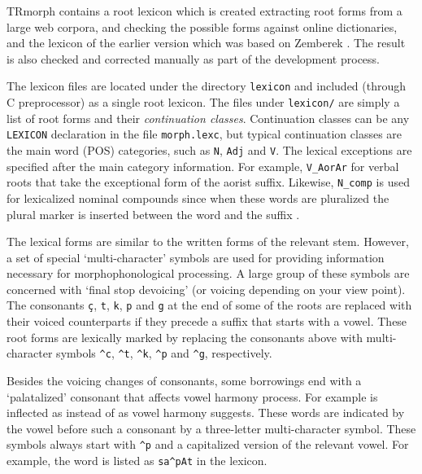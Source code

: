 \documentclass[twocolumn]{article}
\begin{document}
TRmorph contains a root lexicon which is created extracting root forms
from a large web corpora, and checking the possible forms against
online dictionaries, and the lexicon of the earlier version which was
based on Zemberek \parencite{akin2007}. The result is also checked and
corrected manually as part of the development process. 

The lexicon files are located under the directory \lstinline{lexicon}
and included (through C preprocessor) as a single root lexicon. The
files under \lstinline{lexicon/} are simply a list of root forms and
their \emph{continuation classes}. Continuation classes can be any
\lstinline{LEXICON} declaration in the file \lstinline{morph.lexc},
but typical continuation classes are the main word (POS) categories,
such as \texttt{N}, \texttt{Adj} and \texttt{V}. The lexical
exceptions are specified after the main category information. For
example, \texttt{V\_AorAr} for verbal roots that take the exceptional
 form of the aorist suffix. Likewise, \texttt{N\_comp} is
used for lexicalized nominal  compounds since when these
words are pluralized the plural marker is inserted between the word
and the suffix .

The lexical forms are similar to the written forms of the relevant
stem. However, a set of special `multi-character' symbols are used for
providing information necessary for morphophonological processing.  A
large group of these symbols are concerned with `final stop devoicing'
(or voicing depending on your view point). The consonants \texttt{ç},
\texttt{t}, \texttt{k}, \texttt{p} and \texttt{g} at the end of some
of the roots are replaced with their voiced counterparts if they
precede a suffix that starts with a vowel. These root forms are
lexically marked by replacing the consonants above with
multi-character symbols \texttt{\^{}c}, \texttt{\^{}t}, \texttt{\^{}k},
\texttt{\^{}p} and \texttt{\^{}g}, respectively. 


Besides the voicing changes of consonants, some borrowings end with a
`palatalized' consonant that affects vowel harmony process. For
example  is inflected as
 instead of  as vowel harmony
suggests. These words are indicated by the vowel before such a
consonant by a three-letter multi-character symbol. These symbols
always start with \texttt{\^{}p} and a capitalized version of the
relevant vowel. For example, the word  is listed as
\texttt{sa\^{}pAt} in the lexicon.
\end{document}

